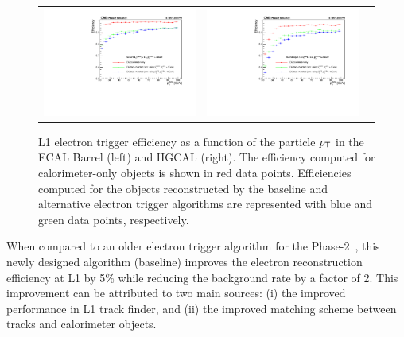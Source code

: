  \begin{figure}[tbh!]
 \begin{center}
 \begin{tabular}{ccc}
  \includegraphics[width=.45\linewidth]{figures/Part2/Upgrade/eff_barrel}&
  \includegraphics[width=.45\linewidth]{figures/Part2/Upgrade/eff_endcap}&
 \end{tabular}
 \caption{\ac{L1} electron trigger efficiency as a function of the particle $p_{\textsf{T}}$ in the \ac{ECAL} Barrel (left) and \ac{HGCAL} (right). The efficiency computed for calorimeter-only objects is shown in red data points. Efficiencies computed for the objects reconstructed by the baseline and alternative electron trigger algorithms are represented with blue and green data points, respectively.}
 \label{fig:eff_electron}
 \end{center}
\end{figure}

When compared to an older electron trigger algorithm for the Phase-2~\cite{Contardo:2015bmq}, this newly designed algorithm (baseline) improves the electron reconstruction efficiency at \ac{L1} by 5\% while reducing the background rate by a factor of 2. This improvement can be attributed to two main sources: (i) the improved performance in \ac{L1} track finder, and (ii) the improved matching scheme between tracks and calorimeter objects.